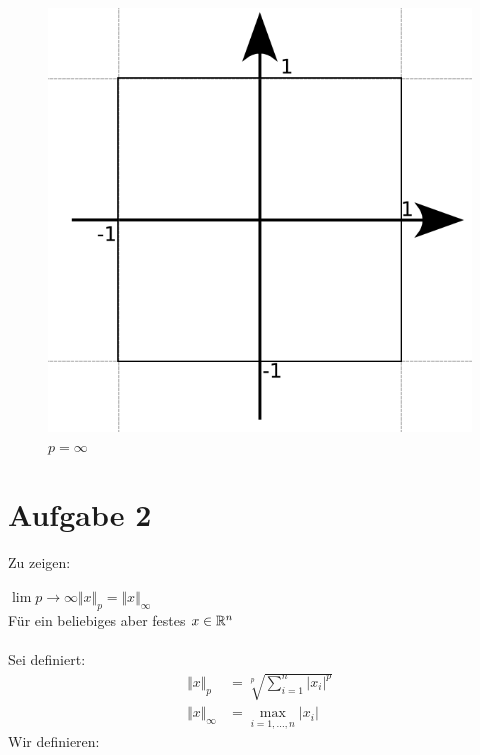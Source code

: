\documentclass{llncs}
\begin{document}
\begin{figure}[h]
	\centering
	\includegraphics[width=1.0\textwidth]{p_inf-kreis.png}
	\caption{$p=\infty$}
\end{figure}
\clearpage
\newpage

\section*{Aufgabe 2}
Zu zeigen:

$\lim{p\to\infty}{\Vert x \Vert_p}=\Vert x \Vert_\infty$\\
Für ein beliebiges aber festes $x\in\mathbb{R}^n$\\\\
Sei definiert:
\begin{align}
\Vert x \Vert_p &= \sqrt[p]{\sum_{i=1}^n{|x_i|^p}}\\
\Vert x \Vert_\infty &= \max_{i=1,...,n}{|x_i|} 
\end{align}
Wir definieren: 
\end{document}
